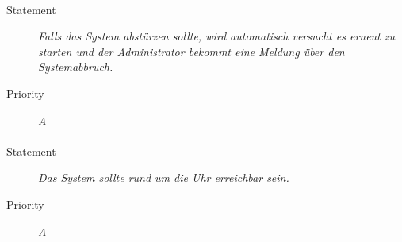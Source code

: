 \paragraph{}
\begin{description}
\item [Statement] \textit{Falls das System abstürzen sollte, wird automatisch versucht es erneut zu starten und der Administrator bekommt eine Meldung über den Systemabbruch.}
\item [Priority] \textit{A}
\end{description}

\paragraph{}
\begin{description}
\item [Statement] \textit{Das System sollte rund um die Uhr erreichbar sein.}
\item [Priority] \textit{A}
\end{description}



